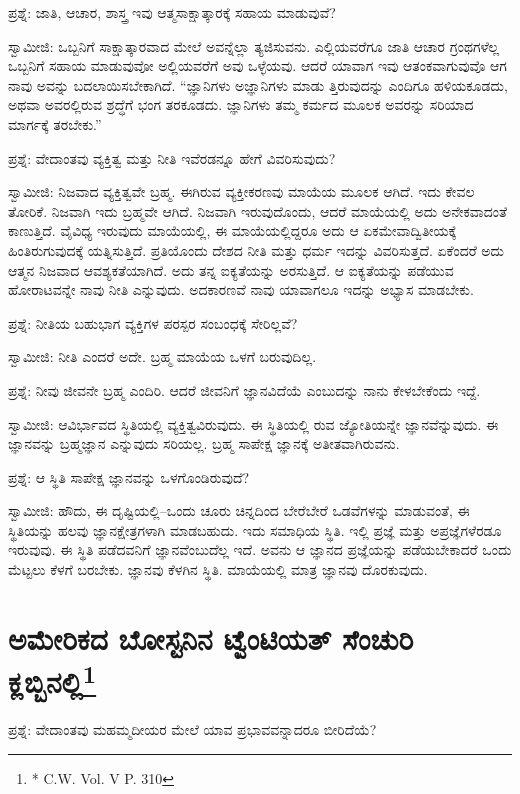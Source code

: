 ಪ್ರಶ್ನೆ: ಜಾತಿ, ಆಚಾರ, ಶಾಸ್ತ್ರ ಇವು ಆತ್ಮಸಾಕ್ಷಾತ್ಕಾರಕ್ಕೆ ಸಹಾಯ ಮಾಡುವುವೆ?

ಸ್ವಾಮೀಜಿ: ಒಬ್ಬನಿಗೆ ಸಾಕ್ಷಾತ್ಕಾರವಾದ ಮೇಲೆ ಅವನ್ನೆಲ್ಲಾ ತ್ಯಜಿಸುವನು. ಎಲ್ಲಿಯವರೆಗೂ ಜಾತಿ ಆಚಾರ ಗ್ರಂಥಗಳೆಲ್ಲ ಒಬ್ಬನಿಗೆ ಸಹಾಯ ಮಾಡುವುವೋ ಅಲ್ಲಿಯವರೆಗೆ ಅವು ಒಳ್ಳೆಯವು. ಆದರೆ ಯಾವಾಗ ಇವು ಆತಂಕವಾಗುವುವೊ ಆಗ ನಾವು ಅವನ್ನು ಬದಲಾಯಿಸಬೇಕಾಗಿದೆ. “ಜ್ಞಾನಿಗಳು ಅಜ್ಞಾನಿಗಳು ಮಾಡು ತ್ತಿರುವುದನ್ನು ಎಂದಿಗೂ ಹಳಿಯಕೂಡದು, ಅಥವಾ ಅವರಲ್ಲಿರುವ ಶ್ರದ್ಧೆಗೆ ಭಂಗ ತರಕೂಡದು. ಜ್ಞಾನಿಗಳು ತಮ್ಮ ಕರ್ಮದ ಮೂಲಕ ಅವರನ್ನು ಸರಿಯಾದ ಮಾರ್ಗಕ್ಕೆ ತರಬೇಕು.”

ಪ್ರಶ್ನೆ: ವೇದಾಂತವು ವ್ಯಕ್ತಿತ್ವ ಮತ್ತು ನೀತಿ ಇವೆರಡನ್ನೂ ಹೇಗೆ ವಿವರಿಸುವುದು?

ಸ್ವಾಮೀಜಿ: ನಿಜವಾದ ವ್ಯಕ್ತಿತ್ವವೇ ಬ್ರಹ್ಮ. ಈಗಿರುವ ವ್ಯಕ್ತೀಕರಣವು ಮಾಯೆಯ ಮೂಲಕ ಆಗಿದೆ. ಇದು ಕೇವಲ ತೋರಿಕೆ. ನಿಜವಾಗಿ ಇದು ಬ್ರಹ್ಮವೇ ಆಗಿದೆ. ನಿಜವಾಗಿ ಇರುವುದೊಂದು, ಆದರೆ ಮಾಯೆಯಲ್ಲಿ ಅದು ಅನೇಕವಾದಂತೆ ಕಾಣುತ್ತಿದೆ. ವೈವಿಧ್ಯ ಇರುವುದು ಮಾಯೆಯಲ್ಲಿ, ಈ ಮಾಯೆಯಲ್ಲಿದ್ದರೂ ಅದು ಆ ಏಕಮೇವಾದ್ವಿತೀಯಕ್ಕೆ ಹಿಂತಿರುಗುವುದಕ್ಕೆ ಯತ್ನಿಸುತ್ತಿದೆ. ಪ್ರತಿಯೊಂದು ದೇಶದ ನೀತಿ ಮತ್ತು ಧರ್ಮ ಇದನ್ನು ವಿವರಿಸುತ್ತದೆ. ಏಕೆಂದರೆ ಅದು ಆತ್ಮನ ನಿಜವಾದ ಆವಶ್ಯಕತೆಯಾಗಿದೆ. ಅದು ತನ್ನ ಐಕ್ಯತೆಯನ್ನು ಅರಸುತ್ತಿದೆ. ಆ ಐಕ್ಯತೆಯನ್ನು ಪಡೆಯುವ ಹೋರಾಟವನ್ನೇ ನಾವು ನೀತಿ ಎನ್ನುವುದು. ಅದಕಾರಣವೆ ನಾವು ಯಾವಾಗಲೂ ಇದನ್ನು ಅಭ್ಯಾಸ ಮಾಡಬೇಕು.

ಪ್ರಶ್ನೆ: ನೀತಿಯ ಬಹುಭಾಗ ವ್ಯಕ್ತಿಗಳ ಪರಸ್ಪರ ಸಂಬಂಧಕ್ಕೆ ಸೇರಿಲ್ಲವೆ?

ಸ್ವಾಮೀಜಿ: ನೀತಿ ಎಂದರೆ ಅದೇ. ಬ್ರಹ್ಮ ಮಾಯೆಯ ಒಳಗೆ ಬರುವುದಿಲ್ಲ.

ಪ್ರಶ್ನೆ: ನೀವು ಜೀವನೇ ಬ್ರಹ್ಮ ಎಂದಿರಿ. ಆದರೆ ಜೀವನಿಗೆ ಜ್ಞಾನವಿದೆಯೆ ಎಂಬುದನ್ನು ನಾನು ಕೇಳಬೇಕೆಂದು ಇದ್ದೆ.

ಸ್ವಾಮೀಜಿ: ಆವಿರ್ಭಾವದ ಸ್ಥಿತಿಯಲ್ಲಿ ವ್ಯಕ್ತಿತ್ವವಿರುವುದು. ಈ ಸ್ಥಿತಿಯಲ್ಲಿ ರುವ ಜ್ಯೋತಿಯನ್ನೇ ಜ್ಞಾನವೆನ್ನುವುದು. ಈ ಜ್ಞಾನವನ್ನು ಬ್ರಹ್ಮಜ್ಞಾನ ಎನ್ನುವುದು ಸರಿಯಲ್ಲ. ಬ್ರಹ್ಮ ಸಾಪೇಕ್ಷ ಜ್ಞಾನಕ್ಕೆ ಅತೀತವಾಗಿರುವನು.

ಪ್ರಶ್ನೆ: ಆ ಸ್ಥಿತಿ ಸಾಪೇಕ್ಷ ಜ್ಞಾನವನ್ನು ಒಳಗೊಂಡಿರುವುದೆ?

ಸ್ವಾಮೀಜಿ: ಹೌದು, ಈ ದೃಷ್ಟಿಯಲ್ಲಿ–ಒಂದು ಚೂರು ಚಿನ್ನದಿಂದ ಬೇರೆಬೇರೆ ಒಡವೆಗಳನ್ನು ಮಾಡುವಂತೆ, ಈ ಸ್ಥಿತಿಯನ್ನು ಹಲವು ಜ್ಞಾನಕ್ಷೇತ್ರಗಳಾಗಿ ಮಾಡಬಹುದು. ಇದು ಸಮಾಧಿಯ ಸ್ಥಿತಿ. ಇಲ್ಲಿ ಪ್ರಜ್ಞೆ ಮತ್ತು ಅಪ್ರಜ್ಞೆಗಳೆರಡೂ ಇರುವುವು. ಈ ಸ್ಥಿತಿ ಪಡೆದವನಿಗೆ ಜ್ಞಾನವೆಂಬುದೆಲ್ಲ ಇದೆ. ಅವನು ಆ ಜ್ಞಾನದ ಪ್ರಜ್ಞೆಯನ್ನು ಪಡೆಯಬೇಕಾದರೆ ಒಂದು ಮೆಟ್ಟಲು ಕೆಳಗೆ ಬರಬೇಕು. ಜ್ಞಾನವು ಕೆಳಗಿನ ಸ್ಥಿತಿ. ಮಾಯೆಯಲ್ಲಿ ಮಾತ್ರ ಜ್ಞಾನವು ದೊರಕುವುದು.


\section[ಅಮೇರಿಕದ ಬೋಸ್ಟನಿನ ಟ್ವೆಂಟಿಯತ್ ಸೆಂಚುರಿ ಕ್ಲಬ್ಬಿನಲ್ಲಿ]{ಅಮೇರಿಕದ ಬೋಸ್ಟನಿನ ಟ್ವೆಂಟಿಯತ್ ಸೆಂಚುರಿ ಕ್ಲಬ್ಬಿನಲ್ಲಿ\protect\footnote{* C.W. Vol. V P. 310}}

ಪ್ರಶ್ನೆ: ವೇದಾಂತವು ಮಹಮ್ಮದೀಯರ ಮೇಲೆ ಯಾವ ಪ್ರಭಾವವನ್ನಾದರೂ ಬೀರಿದೆಯೆ?

